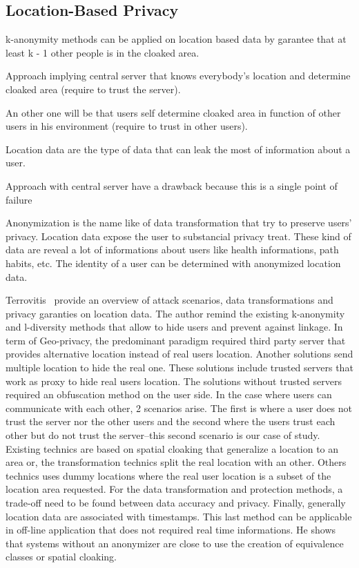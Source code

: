 \subsection{Location-Based Privacy}


k-anonymity methods can be applied on location based data by garantee that at least k - 1 other people is in the cloaked area.

Approach implying central server that knows everybody's location and determine cloaked area (require to trust the server).

An other one will be that users self determine cloaked area in function of other users in his environment (require to trust in other users).

Location data are the type of data that can leak the most of information about a user.

Approach with central server have a drawback because this is a single point of failure

Anonymization is the name like of data transformation that try to preserve users' privacy.
Location data expose the user to substancial privacy treat.
These kind of data are reveal a lot of informations about users like health informations, path habits, etc.
The identity of a user can be determined with anonymized location data.



Terrovitis~\cite{DBLP:journals/sigkdd/Terrovitis11} provide an overview of attack scenarios, data transformations and privacy garanties on location data.
The author remind the existing k-anonymity and l-diversity methods that allow to hide users and prevent against linkage.
In term of Geo-privacy, the predominant paradigm required third party server that provides alternative location instead of real users location.
Another solutions send multiple location to hide the real one.
These solutions include trusted servers that work as proxy to hide real users location.
The solutions without trusted servers required an obfuscation method on the user side.
In the case where users can communicate with each other, 2 scenarios arise. 
The first is where a user does not trust the server nor the other users and the second where the users trust each other but do not trust the server--this second scenario is our case of study.
Existing technics are based on spatial cloaking that generalize a location to an area or, the transformation technics split the real location with an other.
Others technics uses dummy locations where the real user location is a subset of the location area requested.
For the data transformation and protection methods, a trade-off need to be found between data accuracy and privacy.
Finally, generally location data are associated with timestamps.
This last method can be applicable in off-line application that does not required real time informations.
He shows that systems without an anonymizer are close to use the creation of equivalence classes or spatial cloaking.

